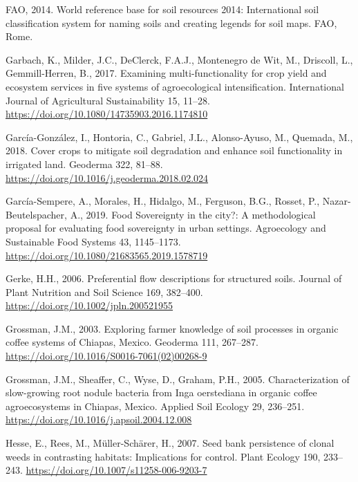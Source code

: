 \documentclass[
  12pt,
]{article}
\newlength{\cslhangindent}
\newlength{\cslentryspacingunit} %
\newenvironment{CSLReferences}[2] %
 {%
  \setlength{\parindent}{0pt}
  \ifodd #1
  \let\oldpar\par
  \def\par{\hangindent=\cslhangindent\oldpar}
  \fi
  \setlength{\parskip}{#2\cslentryspacingunit}
 }%
 {}
\begin{document}
\begin{CSLReferences}{1}{0}
\leavevmode{}%
FAO, 2014. World reference base for soil resources 2014: International soil classification system for naming soils and creating legends for soil maps. {FAO}, {Rome}.

\leavevmode{}%
Garbach, K., Milder, J.C., DeClerck, F.A.J., Montenegro de Wit, M., Driscoll, L., Gemmill-Herren, B., 2017. Examining multi-functionality for crop yield and ecosystem services in five systems of agroecological intensification. International Journal of Agricultural Sustainability 15, 11--28. \url{https://doi.org/10.1080/14735903.2016.1174810}

\leavevmode{}%
García-González, I., Hontoria, C., Gabriel, J.L., Alonso-Ayuso, M., Quemada, M., 2018. Cover crops to mitigate soil degradation and enhance soil functionality in irrigated land. Geoderma 322, 81--88. \url{https://doi.org/10.1016/j.geoderma.2018.02.024}

\leavevmode{}%
García-Sempere, A., Morales, H., Hidalgo, M., Ferguson, B.G., Rosset, P., Nazar-Beutelspacher, A., 2019. Food {Sovereignty} in the city?: {A} methodological proposal for evaluating food sovereignty in urban settings. Agroecology and Sustainable Food Systems 43, 1145--1173. \url{https://doi.org/10.1080/21683565.2019.1578719}

\leavevmode{}%
Gerke, H.H., 2006. Preferential flow descriptions for structured soils. Journal of Plant Nutrition and Soil Science 169, 382--400. \url{https://doi.org/10.1002/jpln.200521955}

\leavevmode{}%
Grossman, J.M., 2003. Exploring farmer knowledge of soil processes in organic coffee systems of {Chiapas}, {Mexico}. Geoderma 111, 267--287. \url{https://doi.org/10.1016/S0016-7061(02)00268-9}

\leavevmode{}%
Grossman, J.M., Sheaffer, C., Wyse, D., Graham, P.H., 2005. Characterization of slow-growing root nodule bacteria from {Inga} oerstediana in organic coffee agroecosystems in {Chiapas}, {Mexico}. Applied Soil Ecology 29, 236--251. \url{https://doi.org/10.1016/j.apsoil.2004.12.008}

\leavevmode{}%
Hesse, E., Rees, M., Müller-Schärer, H., 2007. Seed bank persistence of clonal weeds in contrasting habitats: Implications for control. Plant Ecology 190, 233--243. \url{https://doi.org/10.1007/s11258-006-9203-7}


\end{CSLReferences}
\end{document}
